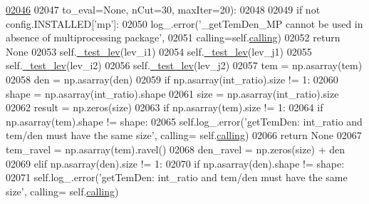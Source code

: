 \begin{DoxyCode}
\hypertarget{classpyneb_1_1core_1_1pynebcore_1_1_atom_l02046}{}\hyperlink{classpyneb_1_1core_1_1pynebcore_1_1_atom_a3a7c4f43d58a5988d04cbe23ed9593ba}{02046} 
02047                   to\_eval=\textcolor{keywordtype}{None}, nCut=30, maxIter=20):
02048         
02049         \textcolor{keywordflow}{if} \textcolor{keywordflow}{not} config.INSTALLED[\textcolor{stringliteral}{'mp'}]:
02050             log\_.error(\textcolor{stringliteral}{'\_getTemDen\_MP cannot be used in absence of multiprocessing package'},
02051                           calling=self.\hyperlink{classpyneb_1_1core_1_1pynebcore_1_1_atom_a373b7735acf4f528b54bddf373ad67a1}{calling})
02052             \textcolor{keywordflow}{return} \textcolor{keywordtype}{None}
02053         self.\hyperlink{classpyneb_1_1core_1_1pynebcore_1_1_atom_afa4b9737dcd5bed31e25e8f0b6dc4730}{\_test\_lev}(lev\_i1)
02054         self.\hyperlink{classpyneb_1_1core_1_1pynebcore_1_1_atom_afa4b9737dcd5bed31e25e8f0b6dc4730}{\_test\_lev}(lev\_j1)
02055         self.\hyperlink{classpyneb_1_1core_1_1pynebcore_1_1_atom_afa4b9737dcd5bed31e25e8f0b6dc4730}{\_test\_lev}(lev\_i2)
02056         self.\hyperlink{classpyneb_1_1core_1_1pynebcore_1_1_atom_afa4b9737dcd5bed31e25e8f0b6dc4730}{\_test\_lev}(lev\_j2)
02057         tem = np.asarray(tem)
02058         den = np.asarray(den)
02059         \textcolor{keywordflow}{if} np.asarray(int\_ratio).size != 1:
02060             shape = np.asarray(int\_ratio).shape
02061             size = np.asarray(int\_ratio).size
02062             result = np.zeros(size) 
02063             \textcolor{keywordflow}{if} np.asarray(tem).size != 1:
02064                 \textcolor{keywordflow}{if} np.asarray(tem).shape != shape:
02065                     self.log\_.error(\textcolor{stringliteral}{'getTemDen: int\_ratio and tem/den must have the same size'}, calling=
      self.\hyperlink{classpyneb_1_1core_1_1pynebcore_1_1_atom_a373b7735acf4f528b54bddf373ad67a1}{calling})
02066                     \textcolor{keywordflow}{return} \textcolor{keywordtype}{None}
02067                 tem\_ravel = np.asarray(tem).ravel()
02068                 den\_ravel = np.zeros(size) + den
02069             \textcolor{keywordflow}{elif} np.asarray(den).size != 1:
02070                 \textcolor{keywordflow}{if} np.asarray(den).shape != shape:
02071                     self.log\_.error(\textcolor{stringliteral}{'getTemDen: int\_ratio and tem/den must have the same size'}, calling=
      self.\hyperlink{classpyneb_1_1core_1_1pynebcore_1_1_atom_a373b7735acf4f528b54bddf373ad67a1}{calling})

\end{DoxyCode}
